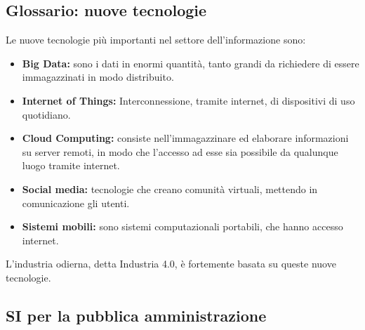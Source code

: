 \documentclass[\main/main.tex]{subfiles}
\begin{document}
\subsection{Glossario: nuove tecnologie}
Le nuove tecnologie più importanti nel settore dell'informazione sono:
\begin{itemize}
\item \textbf{Big Data:} sono i dati in enormi quantità, tanto grandi da richiedere di essere immagazzinati in modo distribuito.
\item \textbf{Internet of Things:} Interconnessione, tramite internet, di dispositivi di uso quotidiano. 
\item \textbf{Cloud Computing:} consiste nell'immagazzinare ed elaborare informazioni su server remoti, in modo che l'accesso ad esse sia possibile da qualunque luogo tramite internet.
\item \textbf{Social media:} tecnologie che creano comunità virtuali, mettendo in comunicazione gli utenti.
\item \textbf{Sistemi mobili:} sono sistemi computazionali portabili, che hanno accesso internet.
\end{itemize}
L'industria odierna, detta Industria 4.0, è fortemente basata su queste nuove tecnologie.

\subsection{SI per la pubblica amministrazione}
\end{document}
